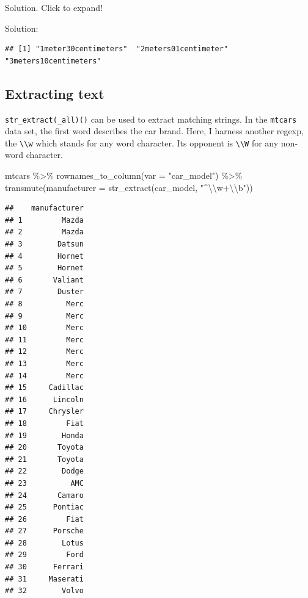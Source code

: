 \documentclass[
]{book}
\newenvironment{Shaded}{\begin{snugshade}}{\end{snugshade}}
\newcommand{\AttributeTok}[1]{\textcolor[rgb]{0.77,0.63,0.00}{#1}}
\newcommand{\FunctionTok}[1]{\textcolor[rgb]{0.00,0.00,0.00}{#1}}
\newcommand{\NormalTok}[1]{#1}
\newcommand{\OtherTok}[1]{\textcolor[rgb]{0.56,0.35,0.01}{#1}}
\newcommand{\SpecialCharTok}[1]{\textcolor[rgb]{0.00,0.00,0.00}{#1}}
\newcommand{\StringTok}[1]{\textcolor[rgb]{0.31,0.60,0.02}{#1}}
\begin{document}
Solution. Click to expand!

Solution:

\begin{Shaded}
\end{Shaded}

\begin{verbatim}
## [1] "1meter30centimeters"  "2meters01centimeter"  "3meters10centimeters"
\end{verbatim}

\hypertarget{extracting-text}{%
\subsection{Extracting text}\label{extracting-text}}

\texttt{str\_extract(\_all)()} can be used to extract matching strings. In the \texttt{mtcars} data set, the first word describes the car brand. Here, I harness another regexp, the \texttt{\textbackslash{}\textbackslash{}w} which stands for any word character. Its opponent is \texttt{\textbackslash{}\textbackslash{}W} for any non-word character.

\begin{Shaded}
\begin{Highlighting}[]
\NormalTok{mtcars }\SpecialCharTok{\%\textgreater{}\%} 
  \FunctionTok{rownames\_to\_column}\NormalTok{(}\AttributeTok{var =} \StringTok{"car\_model"}\NormalTok{) }\SpecialCharTok{\%\textgreater{}\%} 
  \FunctionTok{transmute}\NormalTok{(}\AttributeTok{manufacturer =} \FunctionTok{str\_extract}\NormalTok{(car\_model, }\StringTok{"\^{}}\SpecialCharTok{\textbackslash{}\textbackslash{}}\StringTok{w+}\SpecialCharTok{\textbackslash{}\textbackslash{}}\StringTok{b"}\NormalTok{))}
\end{Highlighting}
\end{Shaded}

\begin{verbatim}
##    manufacturer
## 1         Mazda
## 2         Mazda
## 3        Datsun
## 4        Hornet
## 5        Hornet
## 6       Valiant
## 7        Duster
## 8          Merc
## 9          Merc
## 10         Merc
## 11         Merc
## 12         Merc
## 13         Merc
## 14         Merc
## 15     Cadillac
## 16      Lincoln
## 17     Chrysler
## 18         Fiat
## 19        Honda
## 20       Toyota
## 21       Toyota
## 22        Dodge
## 23          AMC
## 24       Camaro
## 25      Pontiac
## 26         Fiat
## 27      Porsche
## 28        Lotus
## 29         Ford
## 30      Ferrari
## 31     Maserati
## 32        Volvo
\end{verbatim}
\end{document}
